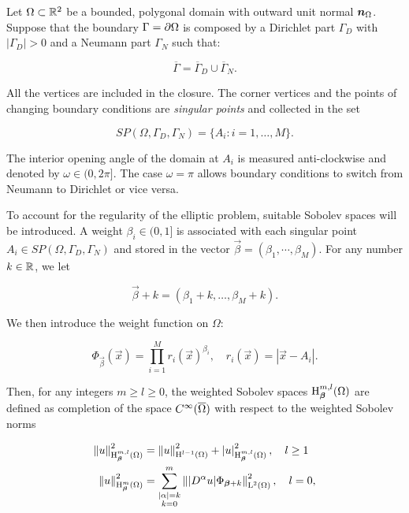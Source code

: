 \documentclass[a4paper,11pt]{article}
\begin{document}
Let $\Omega \subset \mathbb R^{2}$ be a bounded, polygonal domain with outward unit normal $\boldsymbol n_{\Omega}$. Suppose that the boundary $\Gamma = \partial \Omega$ is composed by a Dirichlet part $\Gamma_{D}$ with $|\Gamma_{D}| > 0$ and a Neumann part $\Gamma_{N}$ such that:


\begin{equation}\label{eq:weight_function}
    \overline{\Gamma}= \overline{\Gamma}_{D} \cup  \overline{\Gamma}_{N}.
\end{equation}

All the vertices are included in the closure. The corner vertices and the points of changing boundary conditions are \textit{singular points} and collected in the set

\begin{equation}\label{eq:corner_points}
   \textit{SP}(\Omega,\Gamma_{D},\Gamma_{N}) = \{ A_{i} : i = 1,\dots,M \}. 
\end{equation}

The interior opening angle of the domain at $A_{i}$ is measured anti-clockwise and denoted by $\omega \in (0,2\pi]$. The case $\omega = \pi$ allows boundary conditions to switch from Neumann to Dirichlet or vice versa.

To account for the regularity of the elliptic problem, suitable Sobolev spaces will be introduced. A weight $\beta_{i} \in (0,1]$ is associated with each singular point $A_{i} \in \textit{SP}(\Omega,\Gamma_{D},\Gamma_{N})$ and stored in the vector $\vec{\beta} = (\beta_{1},\cdots,\beta_{M})$. For any number $k \in \mathbb R$, we let 

$$ \vec{\beta} + k = (\beta_{1} + k,\dots,\beta_{M} + k).$$

We then introduce the weight function on $\Omega$:

\begin{equation*}
    \Phi_{\vec{\beta}}(\vec{x}) = \prod_{i=1}^{M} r_{i}(\vec{x})^{\beta_{i}}, \quad  r_{i}(\vec{x}) = |\vec{x} - A_{i}|.
\end{equation*}

Then, for any integers $m \geq l \geq 0$, the weighted Sobolev spaces $\operatorname H^{m,l}_{\boldsymbol \beta}(\Omega)$ are defined as completion of the space $C^{\infty}(\overline{\Omega})$ with respect to the weighted Sobolev norms

\begin{equation}\label{eq:weighted_sobolev_norms}
\begin{split}
\left\|u\right\|^{2}_{\operatorname H^{m,l}_{\boldsymbol \beta}(\Omega)} &= \left\|u\right\|^{2}_{\operatorname H^{l-1}(\Omega)} +   \left|u\right|^{2}_{\operatorname H^{m,l}_{\boldsymbol \beta}(\Omega)}, \quad l \geq 1\\ 
\left\|u\right\|^{2}_{\operatorname H^{m}_{\boldsymbol \beta}(\Omega)} &= \sum_{\substack{|\alpha| = k \\ k=0}}^{m} \left\||D^{\alpha}u| \Phi_{\boldsymbol \beta + k}\right\|^{2}_{\operatorname L^{2}(\Omega)}, \quad  l = 0,
\end{split}
\end{equation}
\end{document}
